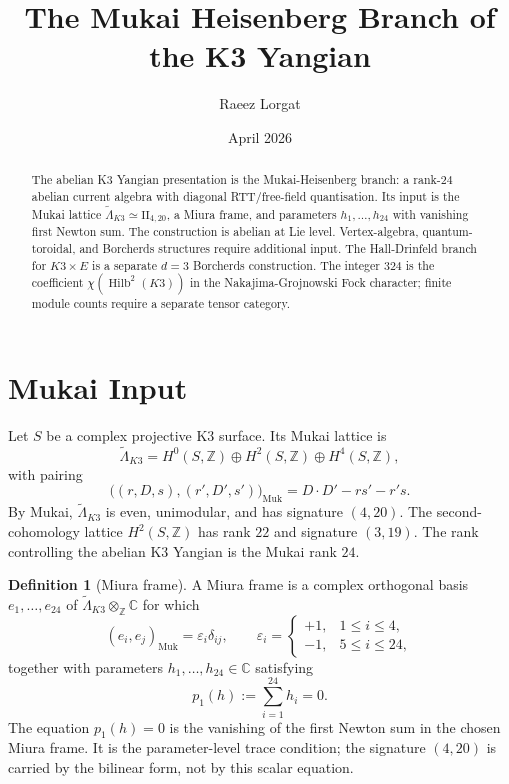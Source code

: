\documentclass[11pt]{article}
\title{The Mukai Heisenberg Branch of the K3 Yangian}
\author{Raeez Lorgat}
\date{April 2026}
\theoremstyle{definition}
\newtheorem{definition}[theorem]{Definition}
\theoremstyle{remark}
\DeclareMathOperator{\Hilb}{Hilb}
\newcommand{\Lmuk}{\widetilde{\Lambda}_{K3}}
\newcommand{\LmukC}{\Lmuk \otimes_{\mathbb{Z}} \mathbb{C}}
\begin{document}
\maketitle

\begin{abstract}
The abelian K3 Yangian presentation is the Mukai-Heisenberg branch:
a rank-$24$ abelian current algebra with diagonal RTT/free-field
quantisation. Its input is the Mukai lattice
$\Lmuk \simeq \mathrm{II}_{4,20}$, a Miura frame, and parameters
$h_1,\ldots,h_{24}$ with vanishing first Newton sum. The construction
is abelian at Lie level. Vertex-algebra, quantum-toroidal, and
Borcherds structures require additional input. The Hall-Drinfeld branch
for $K3 \times E$ is a separate $d=3$ Borcherds construction. The
integer $324$ is the coefficient $\chi(\Hilb^2(K3))$ in the
Nakajima-Grojnowski Fock character; finite module counts require a
separate tensor category.
\end{abstract}

\tableofcontents

\section{Mukai Input}
\label{sec:mukai-input}

Let $S$ be a complex projective K3 surface. Its Mukai lattice is
\[
  \Lmuk
  =
  H^0(S,\mathbb{Z}) \oplus H^2(S,\mathbb{Z}) \oplus H^4(S,\mathbb{Z}),
\]
with pairing
\[
  \bigl((r,D,s),(r',D',s')\bigr)_{\mathrm{Muk}}
  =
  D \cdot D' - rs' - r's .
\]
By Mukai, $\Lmuk$ is even, unimodular, and has signature $(4,20)$.
The second-cohomology lattice $H^2(S,\mathbb{Z})$ has rank $22$ and
signature $(3,19)$. The rank controlling the abelian K3 Yangian is the
Mukai rank $24$.

\begin{definition}[Miura frame]
\label{def:miura-frame}
A Miura frame is a complex orthogonal basis
$e_1,\ldots,e_{24}$ of $\LmukC$ for which
\[
  (e_i,e_j)_{\mathrm{Muk}} = \varepsilon_i \delta_{ij},
  \qquad
  \varepsilon_i =
  \begin{cases}
    +1, & 1 \leq i \leq 4,\\
    -1, & 5 \leq i \leq 24,
  \end{cases}
\]
together with parameters $h_1,\ldots,h_{24} \in \mathbb{C}$ satisfying
\[
  p_1(h) := \sum_{i=1}^{24} h_i = 0 .
\]
The equation $p_1(h)=0$ is the vanishing of the first Newton sum in
the chosen Miura frame. It is the parameter-level trace condition; the
signature $(4,20)$ is carried by the bilinear form, not by this scalar
equation.
\end{definition}
\end{document}
